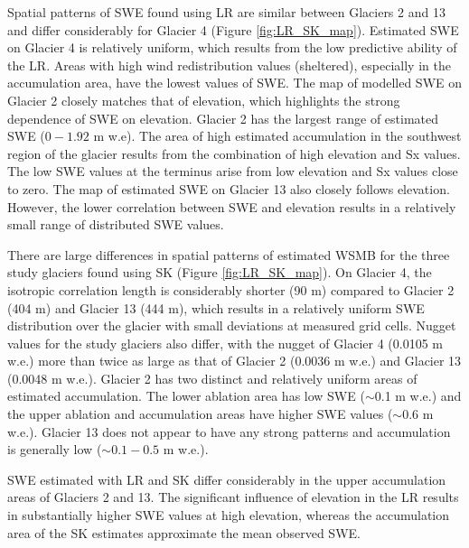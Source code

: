 \documentclass[review,oneside, letterpaper]{igs}
\begin{document}
Spatial patterns of SWE found using LR are similar between Glaciers 2 and 13 and differ considerably for Glacier 4 (Figure \ref{fig:LR_SK_map}). Estimated SWE on Glacier 4 is relatively uniform, which results from the low predictive ability of the LR. Areas with high wind redistribution values (sheltered), especially in the accumulation area, have the lowest values of SWE. The map of modelled SWE on Glacier 2 closely matches that of elevation, which highlights the strong dependence of SWE on elevation. Glacier 2 has the largest range of estimated SWE ($0 - 1.92$ m w.e). The area of high estimated accumulation in the southwest region of the glacier  results from the combination of high elevation and Sx values. The low SWE values at the terminus arise from low elevation and Sx values close to zero. The map of estimated SWE on Glacier 13 also closely follows elevation. However, the lower correlation between SWE and elevation results in a relatively small range of distributed SWE values.

There are large differences in spatial patterns of estimated WSMB for the three study glaciers found using SK (Figure \ref{fig:LR_SK_map}). On Glacier 4, the isotropic correlation length is considerably shorter (90 m) compared to Glacier 2 (404 m) and Glacier 13 (444 m), which results in a relatively uniform SWE distribution over the glacier with small deviations at measured grid cells. Nugget values for the study glaciers also differ, with the nugget of Glacier 4 (0.0105 m w.e.) more than twice as large as that of Glacier 2 (0.0036 m w.e.) and Glacier 13 (0.0048 m w.e.). Glacier 2 has two distinct and relatively uniform areas of estimated accumulation. The lower ablation area has low SWE ($\sim$0.1 m w.e.) and the upper ablation and accumulation areas have higher SWE values ($\sim$0.6 m w.e.). Glacier 13 does not appear to have any strong patterns and accumulation is generally low ($\sim0.1-0.5$ m w.e.).

SWE estimated with LR and SK differ considerably in the upper accumulation areas of Glaciers 2 and 13. The significant influence of elevation in the LR results in substantially higher SWE values at high elevation, whereas the accumulation area of the SK estimates approximate the mean observed SWE. 
\end{document}
